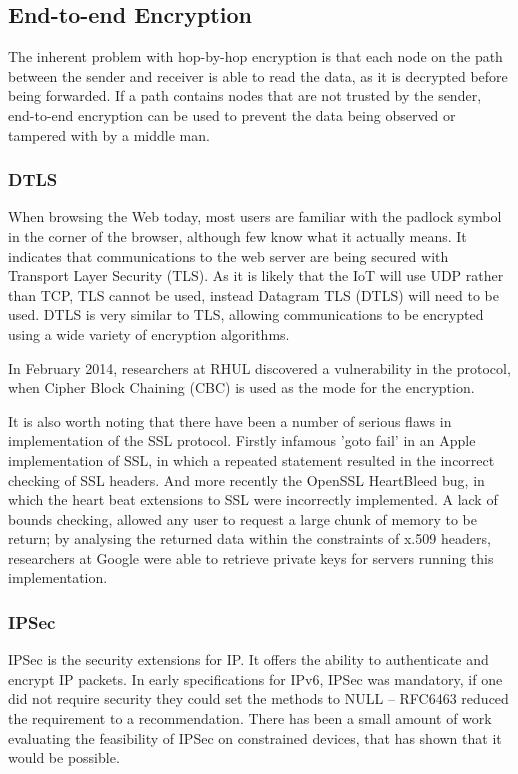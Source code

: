 \documentclass[10pt,journal,compsoc]{IEEEtran}
\begin{document}
\subsection{End-to-end Encryption}
The inherent problem with hop-by-hop encryption is that each node on the path
between the sender and receiver is able to read the data, as it is decrypted
before being forwarded.   If a path contains nodes that are not trusted by the
sender, end-to-end encryption can be used to prevent the data being observed or
tampered with by a middle man. 

\subsubsection{DTLS}
When browsing the Web today, most users are familiar with the padlock symbol in
the corner of the browser, although few know what it actually means. It
indicates that communications to the web server are being secured with
Transport Layer Security (TLS). As it is likely that the IoT will use UDP
rather than TCP, TLS cannot be used, instead Datagram TLS (DTLS) will need to
be used. DTLS is very similar to TLS, allowing communications to be encrypted
using a wide variety of encryption algorithms.  

In February 2014, researchers at RHUL discovered a vulnerability in the
protocol, when Cipher Block Chaining (CBC) is used as the mode for the
encryption. 

It is also worth noting that there have been a number of serious flaws in
implementation of the SSL protocol. Firstly infamous 'goto fail' in an Apple
implementation of SSL, in which a repeated statement resulted in the incorrect
checking of SSL headers. And more recently the OpenSSL HeartBleed bug, in
which the heart beat extensions to SSL were incorrectly implemented. A lack of
bounds checking, allowed any user to request a large chunk of memory to be
return; by analysing the returned data within the constraints of x.509 headers,
researchers at Google were able to retrieve private keys for servers running
this implementation. 

\subsubsection{IPSec}
IPSec is the security extensions for IP. It offers the ability to authenticate
and encrypt IP packets. In early specifications for IPv6, IPSec was mandatory,
if one did not require security they could set the methods to NULL -- RFC6463
reduced the requirement to a recommendation. There has been a small amount
of work evaluating the feasibility of IPSec on constrained devices, that
has shown that it would be possible. 
\end{document}

